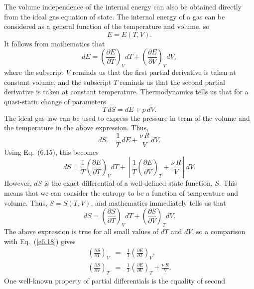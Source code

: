 The volume independence of the internal energy can also
be obtained directly from  the ideal gas equation of state. 
The internal energy of a gas can be considered as a general function of the
temperature and volume, so
\begin{equation}
E= E(T, V).
\end{equation}
It follows from mathematics that
\begin{equation}
dE = \left(\frac{\partial E}{\partial T}\right)_V dT + \left( \frac{\partial E}
{\partial V}\right)_T dV,
\end{equation}
where the subscript $V$ reminds us that the first partial derivative is taken
at constant volume, and the subscript $T$ reminds us that the second
partial  derivative
is taken at constant temperature. Thermodynamics tells us that for a quasi-static
change of parameters
\begin{equation}
T\, dS = dE + p\, dV.
\end{equation}
The ideal gas law can be used to express the pressure in term of the volume and
the temperature in the above expression. Thus,
\begin{equation}
dS = \frac{1}{T}\, dE+ \frac{\nu\, R}{V}\, dV.
\end{equation}
Using Eq.~(6.15), this becomes
\begin{equation}
dS = \frac{1}{T} \left(\frac{\partial E}{\partial T}\right)_V dT
+\left[ \frac{1}{T} \left(\frac{\partial E}{\partial V}\right)_T +
\frac{\nu\, R}{V}\right] dV.\label{e6.18}
\end{equation}
However, $dS$ is the exact differential of a well-defined state function, 
$S$.
This means that we can consider the entropy to be a function of temperature and
volume. Thus, $S=S(T,V)$, and mathematics immediately tells us that
\begin{equation}
dS = \left(\frac{\partial S}{\partial T}\right)_V dT + \left( \frac{\partial S}
{\partial V}\right)_T dV.
\end{equation}
The above  expression is true for all small values of $dT$ and $dV$, so a comparison
with Eq.~(\ref{e6.18}) gives
\begin{eqnarray}
\left(\frac{\partial S}{\partial T}\right)_V &=& \frac{1}{T} \left(\frac{\partial E}
{\partial T}\right)_V,\label{e6.20}\\[0.5ex]
\left(\frac{\partial S}{\partial V}\right)_T &=& \frac{1}{T} \left(\frac{\partial E}
{\partial V} \right)_T + \frac{\nu \,R}{V}.\label{e6.20a}
\end{eqnarray}
One well-known property of partial differentials is the equality of second
